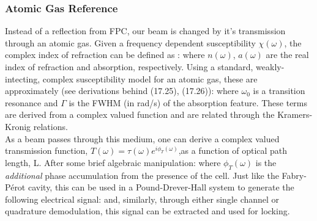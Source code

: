 \subsubsection{Atomic Gas Reference}

Instead of a reflection from FPC, our beam is changed by it's transmission through an atomic gas. Given a frequency dependent susceptibility $\chi(\omega)$, the complex index of refraction can be defined as \cite{steckoptics}:
where $n(\omega)$, $a(\omega)$ are the real index of refraction and absorption, respectively. Using a standard, weakly-intecting, complex susceptibility model for an atomic gas, these are approximately \cite{steckoptics} (see derivations behind (17.25), (17.26)):
where $\omega_0$ is a transition resonance and $\Gamma$ is the FWHM (in rad/s) of the absorption feature. These terms are derived from a complex valued function and are related through the Kramers-Kronig relations.\\

As a beam passes through this medium, one can derive a complex valued transmission function, $T(\omega)=\tau(\omega)e^{i\phi_T(\omega)}$,as a function of optical path length, L. After some brief algebraic manipulation:
where $\phi_T(\omega)$ is the \emph{additional} phase accumulation from the presence of the cell. Just like the Fabry-P{\'e}rot cavity, this can be used in a Pound-Drever-Hall system to generate the following electrical signal:
and, similarly, through either single channel or quadrature demodulation, this signal can be extracted and used for locking.



